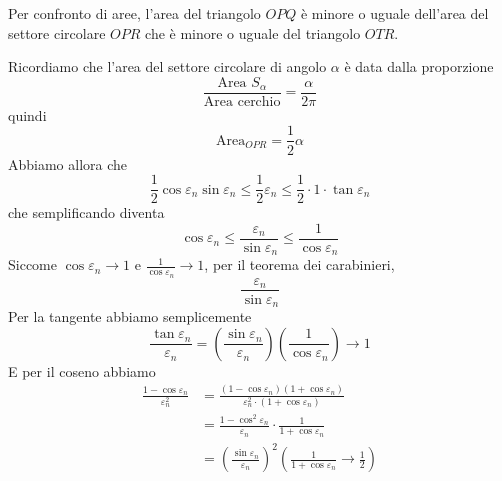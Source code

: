 \documentclass[a4paper]{article}
\begin{document}
{\begin{enumerate}
        Per confronto di aree,
        l'area del triangolo \(OPQ\) è minore o uguale dell'area del settore circolare \(OPR\)
        che è minore o uguale del triangolo \(OTR\).
        
        Ricordiamo che l'area del settore circolare di angolo \(\alpha\) è data dalla proporzione
        \[
            \frac{\text{Area } S_\alpha}{\text{Area cerchio}} = \frac{\alpha}{2\pi}
        \]
        quindi
        \[
            \text{Area}_{OPR} = \frac{1}{2} \alpha
        \]
        Abbiamo allora che
        \[
            \frac{1}{2} \cos \varepsilon_n \sin \varepsilon_n
            \leq
            \frac{1}{2} \varepsilon_n
            \leq
            \frac{1}{2} \cdot 1 \cdot \tan \varepsilon_n
        \]
        che semplificando diventa
        \[
            \cos \varepsilon_n \leq \frac{\varepsilon_n}{\sin \varepsilon_n}
            \leq \frac{1}{\cos \varepsilon_n}
        \]
        Siccome \(\cos \varepsilon_n \to 1\) e \(\frac{1}{\cos \varepsilon_n} \to 1\),
        per il teorema dei carabinieri,
        \[
            \frac{\varepsilon_n}{\sin \varepsilon_n}
        \]
        Per la tangente abbiamo semplicemente
        \[
            \frac{\tan \varepsilon_n}{\varepsilon_n} = \left(\frac{\sin \varepsilon_n}{\varepsilon_n}\right)
            \left(\frac{1}{\cos \varepsilon_n}\right) \to 1
        \]
        E per il coseno abbiamo
        \begin{align*}
            \frac{1-\cos \varepsilon_n}{\varepsilon_n^2} &= \frac{
                (1 - \cos \varepsilon_n) ( 1 + \cos \varepsilon_n)
            }{
                \varepsilon_n^2 \cdot (1 + \cos \varepsilon_n)
            } \\
            &= \frac{1 - \cos^2 \varepsilon_n}{\varepsilon_n} \cdot \frac{1}{1 + \cos \varepsilon_n} \\
            &= {\left(\frac{\sin \varepsilon_n}{\varepsilon_n}\right)}^2 \left(\frac{1}{1 + \cos \varepsilon_n} \to \frac{1}{2}\right)
        \end{align*}
    \end{enumerate}
}

\end{document}
